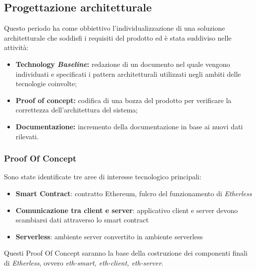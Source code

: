 \subsection{Progettazione architetturale}
Questo periodo ha come obbiettivo l'individualizzazione di una soluzione architetturale che soddisfi i requisiti del prodotto ed è stata suddiviso nelle attività:
\begin{itemize}
	\item \textbf{Technology \textit{Baseline\glos}:} redazione di un documento nel quale vengono individuati e specificati i pattern architetturali utilizzati negli ambiti delle tecnologie coinvolte;
	\item  \textbf{Proof of concept:} codifica di una bozza del prodotto per verificare la correttezza dell'architettura del sistema;
	\item \textbf{Documentazione:} incremento della documentazione in base ai nuovi dati rilevati.
\end{itemize}
\subsubsection{Proof Of Concept}
Sono state identificate tre aree di interesse tecnologico principali:
\begin{itemize}
	\item \textbf{Smart Contract}: contratto Ethereum\glo, fulcro del funzionamento di \textit{Etherless}
	\item \textbf{Comunicazione tra client e server}: applicativo client e server devono scambiarsi dati attraverso lo smart contract
	\item \textbf{Serverless\glo}: ambiente server convertito in ambiente serverless\glo
\end{itemize}
Questi Proof Of Concept saranno la base della costruzione dei componenti finali di \textit{Etherless}, ovvero \textit{eth-smart, eth-client, eth-server}.
